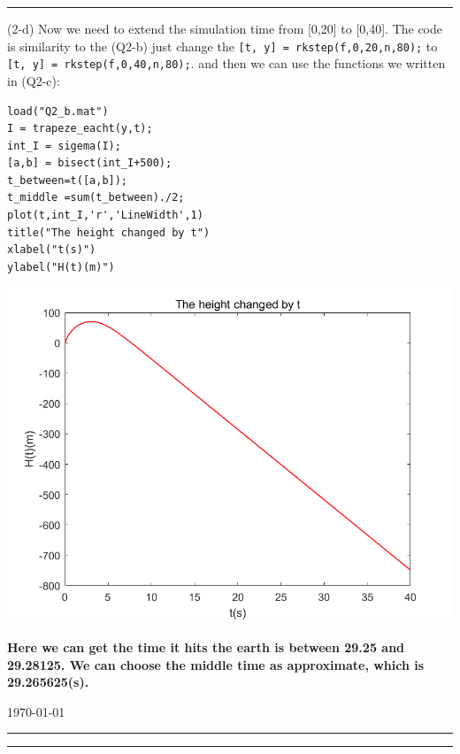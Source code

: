 \documentclass{article}
\begin{document}
\begin{flushleft}
\begin{enumerate}
\begin{framed}
\rule[-0.7mm]{45em}{0.5pt}
(2-d)
\newline
Now we need to extend the simulation time from [0,20] to [0,40].
The code is similarity to the (Q2-b) just change the \verb|[t, y] = rkstep(f,0,20,n,80);| to \verb|[t, y] = rkstep(f,0,40,n,80);|. and then we can use the functions we written in (Q2-c):
\begin{multicols}{2}
\begin{verbatim}
load("Q2_b.mat")
I = trapeze_eacht(y,t);
int_I = sigema(I);
[a,b] = bisect(int_I+500);
t_between=t([a,b]);
t_middle =sum(t_between)./2;
plot(t,int_I,'r','LineWidth',1)
title("The height changed by t")
xlabel("t(s)")
ylabel("H(t)(m)")
\end{verbatim}
\columnbreak
\includegraphics[width={0.9\linewidth}]{Q2_d_h.png}
\end{multicols}
\textbf{Here we can get the time it hits the earth is between 29.25 and 29.28125. We can choose the middle time as approximate, which is 29.265625(s).}
\end{framed}
\end{enumerate}
\end{flushleft}

\hfill\today
\hrule
\hrule

\vfill
\end{document}
